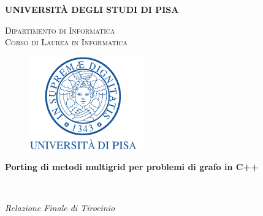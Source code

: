 
\begin{titlepage}
\begin{center}
\begin{LARGE}
\textbf{UNIVERSIT\`A DEGLI STUDI DI PISA}\\
\vspace{10pt}
\end{LARGE}


\begin{large}
\textsc{Dipartimento di Informatica} \\
\vspace{10pt} \textsc{Corso di Laurea in Informatica}
\end{large}

\vspace{1cm}

\begin{figure}[htbp]
\begin{center}
\includegraphics[angle=0, height=4cm]{Grafica/cherubino.pdf}
\end{center}
\end{figure}


\begin{Large}
\begin{center}
\textbf{Porting di metodi multigrid per problemi di grafo in C++}
\end{center}
\end{Large}

\ \\
\begin{Large}
\textsl{Relazione Finale di Tirocinio}
\end{Large}
\\


\end{center}
\end{titlepage}
